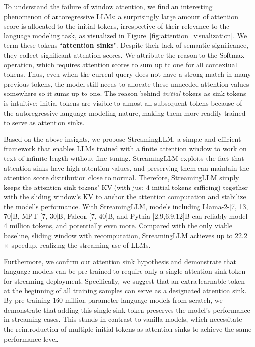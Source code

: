 To understand the failure of window attention, we find an interesting phenomenon of autoregressive LLMs: a surprisingly large amount of attention score is allocated to the initial tokens, irrespective of their relevance to the language modeling task, as visualized in Figure~\ref{fig:attention_visualization}. We term these tokens ``\textbf{attention sinks}". Despite their lack of semantic significance, they collect significant attention scores. We attribute the reason to the Softmax operation, which requires attention scores to sum up to one for all contextual tokens. Thus, even when the current query does not have a strong match in many previous tokens, the model still needs to allocate these unneeded attention values somewhere so it sums up to one. The reason behind \textit{initial} tokens as sink tokens is intuitive: initial tokens are visible to almost all subsequent tokens because of the autoregressive language modeling nature, making them more readily trained to serve as attention sinks.

Based on the above insights, we propose StreamingLLM, a simple and efficient framework that enables LLMs trained with a finite attention window to work on text of infinite length without fine-tuning. StreamingLLM exploits the fact that attention sinks have high attention values, and preserving them can maintain the attention score distribution close to normal. Therefore, StreamingLLM simply keeps the attention sink tokens' KV (with just 4 initial tokens sufficing) together with the sliding window's KV to anchor the attention computation and stabilize the model's performance. With StreamingLLM, models including Llama-2-[7, 13, 70]B, MPT-[7, 30]B, Falcon-[7, 40]B, and Pythia-[2.9,6.9,12]B can reliably model 4 million tokens, and potentially even more. Compared with the only viable baseline, sliding window with recomputation, StreamingLLM achieves up to 22.2$\times$ speedup, realizing the streaming use of LLMs.

Furthermore, we confirm our attention sink hypothesis and demonstrate that language models can be pre-trained to require only a single attention sink token for streaming deployment. Specifically, we suggest that an extra learnable token at the beginning of all training samples can serve as a designated attention sink. By pre-training 160-million parameter language models from scratch, we demonstrate that adding this single sink token preserves the model's performance in streaming cases. This stands in contrast to vanilla models, which necessitate the reintroduction of multiple initial tokens as attention sinks to achieve the same performance level.

